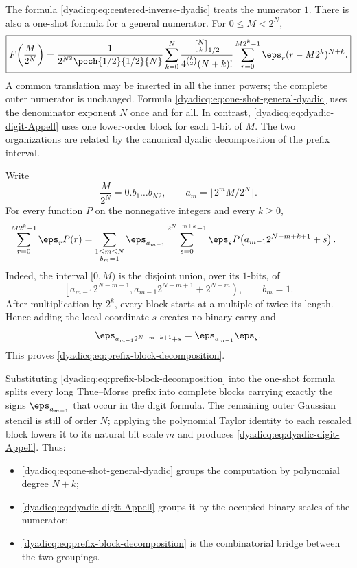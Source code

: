 \documentclass[11pt,oneside]{article}
\theoremstyle{definition}
\theoremstyle{remark}
\newcommand{\qbinom}[3]{\genfrac{[}{]}{0pt}{}{#1}{#2}_{#3}}
\begin{document}
The formula \eqref{dyadicq:eq:centered-inverse-dyadic} treats the numerator $1$.
There is also a one-shot formula for a general numerator.  For
$0\le M<2^N$,
\begin{equation}\label{dyadicq:eq:one-shot-general-dyadic}
\boxed{
 F\!\left(\frac{M}{2^N}\right)
 =\frac1{2^{N^2}\poch{1/2}{1/2}{N}}
 \sum_{k=0}^{N}
 \frac{\qbinom{N}{k}{1/2}}
 {4^{\binom k2}(N+k)!}
 \sum_{r=0}^{M2^k-1}
 \eps_r(r-M2^k)^{N+k}.}
\end{equation}
A common translation may be inserted in all the inner powers; the complete
outer numerator is unchanged.  Formula \eqref{dyadicq:eq:one-shot-general-dyadic}
uses the denominator exponent $N$ once and for all.  In contrast,
\eqref{dyadicq:eq:dyadic-digit-Appell} uses one lower-order block for each $1$-bit of
$M$.  The two organizations are related by the canonical dyadic decomposition
of the prefix interval.

Write
\[
 \frac{M}{2^N}=0.b_1\ldots b_N{}_2,
 \qquad
 a_m=\lfloor2^mM/2^N\rfloor.
\]
For every function $P$ on the nonnegative integers and every $k\ge0$,
\begin{align}\label{dyadicq:eq:prefix-block-decomposition}
 \sum_{r=0}^{M2^k-1}\eps_rP(r)
 &=\sum_{\substack{1\le m\le N\\b_m=1}}
 \eps_{a_{m-1}}
 \sum_{s=0}^{2^{N-m+k}-1}\eps_s
 P\!\left(a_{m-1}2^{N-m+k+1}+s\right).
\end{align}
Indeed, the interval $[0,M)$ is the disjoint union, over its $1$-bits, of
\[
 \left[a_{m-1}2^{N-m+1},
       a_{m-1}2^{N-m+1}+2^{N-m}\right),
 \qquad b_m=1.
\]
After multiplication by $2^k$, every block starts at a multiple of twice its
length.  Hence adding the local coordinate $s$ creates no binary carry and
\[
 \eps_{a_{m-1}2^{N-m+k+1}+s}
 =\eps_{a_{m-1}}\eps_s.
\]
This proves \eqref{dyadicq:eq:prefix-block-decomposition}.

Substituting \eqref{dyadicq:eq:prefix-block-decomposition} into the one-shot formula
splits every long Thue--Morse prefix into complete blocks carrying exactly the
signs $\eps_{a_{m-1}}$ that occur in the digit formula.  The remaining outer
Gaussian stencil is still of order $N$; applying the polynomial Taylor
identity to each rescaled block lowers it to its natural bit scale $m$ and
produces \eqref{dyadicq:eq:dyadic-digit-Appell}.  Thus:
\begin{itemize}
\item \eqref{dyadicq:eq:one-shot-general-dyadic} groups the computation by polynomial
  degree $N+k$;
\item \eqref{dyadicq:eq:dyadic-digit-Appell} groups it by the occupied binary scales of
  the numerator;
\item \eqref{dyadicq:eq:prefix-block-decomposition} is the combinatorial bridge between
  the two groupings.
\end{itemize}
\end{document}
